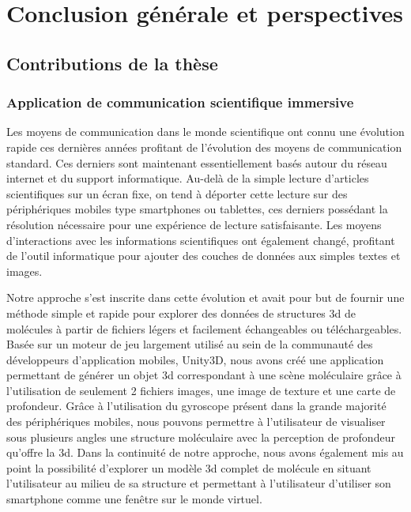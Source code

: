 


\chapter*{Conclusion générale et perspectives}
\mtcaddchapter

\mtcaddpart




\section*{Contributions de la thèse}


\subsection*{Application de communication scientifique immersive}

Les moyens de communication dans le monde scientifique ont connu une évolution rapide ces dernières années profitant de l'évolution des moyens de communication standard. Ces derniers sont maintenant essentiellement basés autour du réseau internet et du support informatique. Au-delà de la simple lecture d'articles scientifiques sur un écran fixe, on tend à déporter cette lecture sur des périphériques mobiles type smartphones ou tablettes, ces derniers possédant la résolution nécessaire pour une expérience de lecture satisfaisante. Les moyens d'interactions avec les informations scientifiques ont également changé, profitant de l'outil informatique pour ajouter des couches de données aux simples textes et images.

Notre approche s'est inscrite dans cette évolution et avait pour but de fournir une méthode simple et rapide pour explorer des données de structures 3d de molécules à partir de fichiers légers et facilement échangeables ou téléchargeables. Basée sur un moteur de jeu largement utilisé au sein de la communauté des développeurs d'application mobiles, Unity3D, nous avons créé une application permettant de générer un objet 3d correspondant à une scène moléculaire grâce à l'utilisation de seulement 2 fichiers images, une image de texture et une carte de profondeur. Grâce à l'utilisation du gyroscope présent dans la grande majorité des périphériques mobiles, nous pouvons permettre à l'utilisateur de visualiser sous plusieurs angles une structure moléculaire avec la perception de profondeur qu'offre la 3d.
Dans la continuité de notre approche, nous avons également mis au point la possibilité d'explorer un modèle 3d complet de molécule en situant l'utilisateur au milieu de sa structure et permettant à l'utilisateur d'utiliser son smartphone comme une fenêtre sur le monde virtuel.


